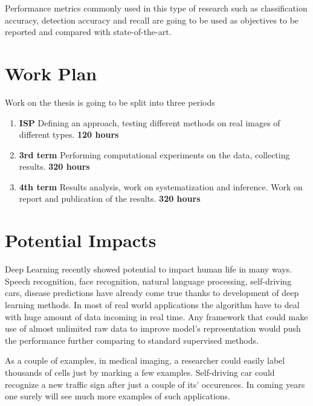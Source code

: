 \documentclass[a4paper]{article}
\begin{document}
Performance metrics commonly used in this type of research such as classification accuracy, detection accuracy and recall are going to be used as objectives to be reported and compared with state-of-the-art.
\section{Work Plan}

Work on the thesis is going to be split into three periods
\begin{enumerate}
\item \textbf{ISP} Defining an approach, testing different methods on real images of different types. \textbf{120 hours}
\item \textbf{3rd term} Performing computational experiments on the data, collecting results. \textbf{320 hours}
\item \textbf{4th term} Results analysis, work on systematization and inference. Work on report and publication of the results. \textbf{320 hours}
\end{enumerate}

\section{Potential Impacts}

Deep Learning recently showed potential to impact human life in many ways. Speech recognition, face recognition, natural language processing, self-driving cars, disease predictions have already come true thanks to development of deep learning methods. In most of real world applications the algorithm have to deal with huge amount of data incoming in real time. Any framework that could make use of almost unlimited raw data to improve model's representation would push the performance further comparing to standard supervised methods.

As a couple of examples, in medical imaging, a researcher could easily label thousands of cells just by marking a few examples. Self-driving car could recognize a new traffic sign after just a couple of its' occurences. In coming years one surely will see much more examples of such applications.

\end{document}
